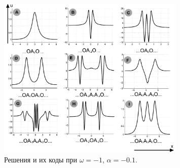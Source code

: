 \documentclass [10pt] {beamer}
\begin{document}
\begin{frame}	
	\begin{figure}
		\includegraphics[width=0.8\textwidth]{pic/classification.pdf}
		\caption{Решения и их коды при $\omega = -1$, $\alpha = -0.1$.}
		\label{pic:classification}
	\end{figure}
\end{frame}
\end{document}
